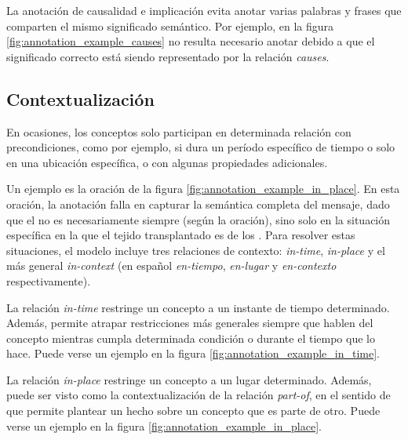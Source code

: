 La anotación de causalidad e implicación evita anotar varias palabras y frases que comparten el mismo significado semántico. Por ejemplo, en la figura \ref{fig:annotation_example_causes} no resulta necesario anotar  debido a que el significado correcto está siendo representado por la relación {\it causes}.

\subsection{Contextualización}
En ocasiones, los conceptos solo participan en determinada relación con precondiciones, como por ejemplo, si dura un período específico de tiempo o solo en una ubicación específica, o con algunas propiedades adicionales.

Un ejemplo es la oración de la figura \ref{fig:annotation_example_in_place}. En esta oración, la anotación  falla en capturar la semántica completa del mensaje, dado que el  no es necesariamente siempre  (según la oración), sino solo en la situación específica en la que el tejido transplantado es de los . Para resolver estas situaciones, el modelo incluye tres relaciones de contexto: {\it in-time}, {\it in-place} y el más general {\it in-context} (en español {\it en-tiempo}, {\it en-lugar} y {\it en-contexto} respectivamente).

La relación {\it in-time} restringe un concepto a un instante de tiempo determinado. Además, permite atrapar restricciones más generales siempre que hablen del concepto mientras cumpla determinada condición o durante el tiempo que lo hace. Puede verse un ejemplo en la figura \ref{fig:annotation_example_in_time}.

La relación {\it in-place} restringe un concepto a un lugar determinado. Además, puede ser visto como la contextualización de la relación {\it part-of}, en el sentido de que permite plantear un hecho sobre un concepto que es parte de otro. Puede verse un ejemplo en la figura \ref{fig:annotation_example_in_place}.

